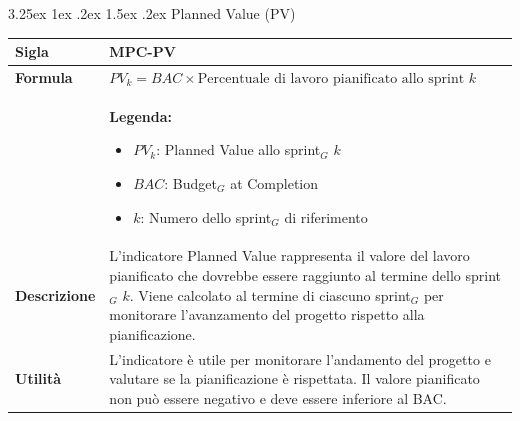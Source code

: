\documentclass[a4paper, 10pt]{article}
\makeatletter
\renewcommand\paragraph{\@startsection{paragraph}{4}{\z@}%
  {3.25ex \@plus1ex \@minus .2ex}%
  {1.5ex \@plus .2ex}%
  {\normalfont\normalsize\bfseries}}
\makeatother
\begin{document}
\vspace{1cm}

\paragraph{Planned Value (PV)}
\mbox{} \\
\noindent
\begin{minipage}{\textwidth}
    \begin{tabularx}{\textwidth}{|>{\columncolor{bluBitless!10}\bfseries}p{3.5cm}|X|}
        \hline
        Sigla & MPC-PV \\ \hline
        Formula &  
        \textit{$PV_{k} = BAC \times \text{Percentuale di lavoro pianificato allo sprint } k$} \vspace{2mm} \\
        & \small \textbf{Legenda:}
        \begin{itemize}
            \item $PV_{k}$: Planned Value allo sprint$_G$ $k$
            \item $BAC$: Budget$_G$ at Completion
            \item $k$: Numero dello sprint$_G$ di riferimento
        \end{itemize} \\ \hline
        Descrizione & L'indicatore Planned Value rappresenta il valore del lavoro pianificato che dovrebbe essere raggiunto al termine dello sprint$_G$ $k$. Viene calcolato al termine di ciascuno sprint$_G$ per monitorare l'avanzamento del progetto rispetto alla pianificazione. \\ \hline
        Utilità & L'indicatore è utile per monitorare l'andamento del progetto e valutare se la pianificazione è rispettata. Il valore pianificato non può essere negativo e deve essere inferiore al BAC. \\ \hline
    \end{tabularx}
\end{minipage}

\vspace{1cm}

\end{document}
